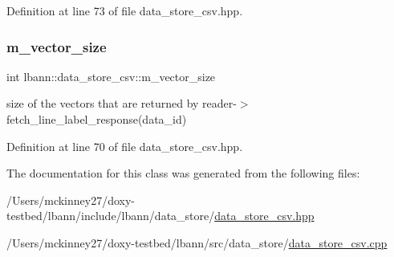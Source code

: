 Definition at line 73 of file data\+\_\+store\+\_\+csv.\+hpp.

\mbox{\label{classlbann_1_1data__store__csv_acf75e96923877e10c8ed499ec48f9320}} 
\subsubsection{\texorpdfstring{m\+\_\+vector\+\_\+size}{m\_vector\_size}}
{\footnotesize\ttfamily int lbann\+::data\+\_\+store\+\_\+csv\+::m\+\_\+vector\+\_\+size\hspace{0.3cm}{\ttfamily [protected]}}

size of the vectors that are returned by reader-\/$>$fetch\+\_\+line\+\_\+label\+\_\+response(data\+\_\+id) 

Definition at line 70 of file data\+\_\+store\+\_\+csv.\+hpp.



The documentation for this class was generated from the following files\+:\begin{DoxyCompactItemize}
\item 
/\+Users/mckinney27/doxy-\/testbed/lbann/include/lbann/data\+\_\+store/\hyperlink{data__store__csv_8hpp}{data\+\_\+store\+\_\+csv.\+hpp}\item 
/\+Users/mckinney27/doxy-\/testbed/lbann/src/data\+\_\+store/\hyperlink{data__store__csv_8cpp}{data\+\_\+store\+\_\+csv.\+cpp}\end{DoxyCompactItemize}
